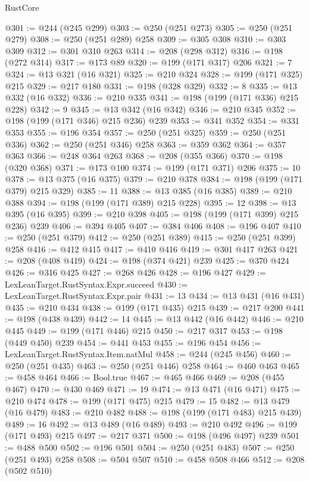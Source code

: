\begin{lexlean}{RustCore}
\begin{coremodule}
@301 := @244 (@245 @299)
@303 := @250 (@251 @273)
@305 := @250 (@251 @279)
@308 := @250 (@251 @289) @258
@309 := @305 @308
@310 := @303 @309
@312 := @301 @310 @263
@314 := @208 (@298 @312)
@316 := @198 (@272 @314)
@317 := @173 @89
@320 := @199 (@171 @317) @206
@321 := 7
@324 := @13 @321 (@16 @321)
@325 := @210 @324
@328 := @199 (@171 @325) @215
@329 := @217 @180
@331 := @198 (@328 @329)
@332 := 8
@335 := @13 @332 (@16 @332)
@336 := @210 @335
@341 := @198 (@199 (@171 @336) @215 @228)
@342 := 9
@345 := @13 @342 (@16 @342)
@346 := @210 @345
@352 := @198 (@199 (@171 @346) @215 @236) @239
@353 := @341 @352
@354 := @331 @353
@355 := @196 @354
@357 := @250 (@251 @325)
@359 := @250 (@251 @336)
@362 := @250 (@251 @346) @258
@363 := @359 @362
@364 := @357 @363
@366 := @248 @364 @263
@368 := @208 (@355 @366)
@370 := @198 (@320 @368)
@371 := @173 @100
@374 := @199 (@171 @371) @206
@375 := 10
@378 := @13 @375 (@16 @375)
@379 := @210 @378
@384 := @198 (@199 (@171 @379) @215 @329)
@385 := 11
@388 := @13 @385 (@16 @385)
@389 := @210 @388
@394 := @198 (@199 (@171 @389) @215 @228)
@395 := 12
@398 := @13 @395 (@16 @395)
@399 := @210 @398
@405 := @198 (@199 (@171 @399) @215 @236) @239
@406 := @394 @405
@407 := @384 @406
@408 := @196 @407
@410 := @250 (@251 @379)
@412 := @250 (@251 @389)
@415 := @250 (@251 @399) @258
@416 := @412 @415
@417 := @410 @416
@419 := @301 @417 @263
@421 := @208 (@408 @419)
@424 := @198 (@374 @421) @239
@425 := @370 @424
@426 := @316 @425
@427 := @268 @426
@428 := @196 @427
@429 := LexLeanTarget.RustSyntax.Expr.succeed
@430 := LexLeanTarget.RustSyntax.Expr.pair
@431 := 13
@434 := @13 @431 (@16 @431)
@435 := @210 @434
@438 := @199 (@171 @435) @215
@439 := @217 @200
@441 := @198 (@438 @439)
@442 := 14
@445 := @13 @442 (@16 @442)
@446 := @210 @445
@449 := @199 (@171 @446) @215
@450 := @217 @317
@453 := @198 (@449 @450) @239
@454 := @441 @453
@455 := @196 @454
@456 := LexLeanTarget.RustSyntax.Item.natMul
@458 := @244 (@245 @456)
@460 := @250 (@251 @435)
@463 := @250 (@251 @446) @258
@464 := @460 @463
@465 := @458 @464
@466 := Bool.true
@467 := @465 @466
@469 := @208 (@455 @467)
@470 := @430 @469
@471 := 19
@474 := @13 @471 (@16 @471)
@475 := @210 @474
@478 := @199 (@171 @475) @215
@479 := 15
@482 := @13 @479 (@16 @479)
@483 := @210 @482
@488 := @198 (@199 (@171 @483) @215 @439)
@489 := 16
@492 := @13 @489 (@16 @489)
@493 := @210 @492
@496 := @199 (@171 @493) @215
@497 := @217 @371
@500 := @198 (@496 @497) @239
@501 := @488 @500
@502 := @196 @501
@504 := @250 (@251 @483)
@507 := @250 (@251 @493) @258
@508 := @504 @507
@510 := @458 @508 @466
@512 := @208 (@502 @510)

\end{coremodule}
\end{lexlean}
